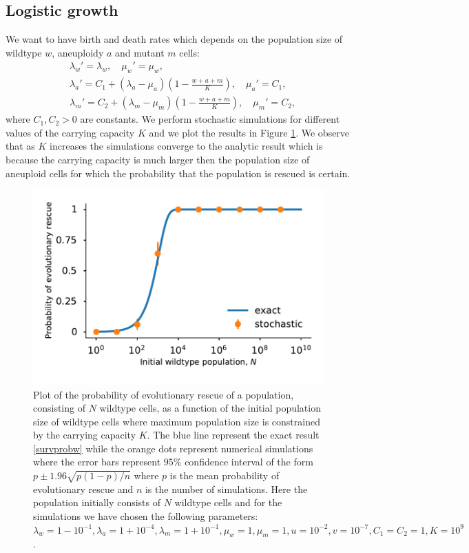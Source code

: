 \documentclass[12pt]{extarticle}
\begin{document}
\subsection*{Logistic growth}
We want to have birth and death rates which depends on the population size of wildtype $w$, aneuploidy $a$ and mutant $m$ cells:
\begin{align*}
&\lambda_w'=\lambda_w,\quad\mu_w'=\mu_w,\\
&\lambda_a'=C_1+\left(\lambda_a-\mu_a\right)\left(1-\frac{w+a+m}{K}\right),\quad \mu_a'=C_1,\\
&\lambda_m'=C_2+\left(\lambda_m-\mu_m\right)\left(1-\frac{w+a+m}{K}\right),\quad \mu_m'=C_2,
\end{align*}
where $C_1, C_2>0$ are constants. We perform stochastic simulations for different values of the carrying capacity $K$ and we plot the results in Figure \ref{SurvPlotNDataLogisticKComplete}.  We observe that as $K$ increases the simulations converge to the analytic result which is because the carrying capacity is much larger then the population size of aneuploid cells for which the probability that the population is rescued is certain.

\begin{figure}[!t]
 \vspace*{1\baselineskip}
\includegraphics[width=1\textwidth]{Figures/SurvPlotNDataLogisticK.pdf}
\caption{Plot of the probability of evolutionary rescue of a population, consisting of $N$ wildtype cells, as a function of the initial population size of wildtype cells where maximum population size is constrained by the carrying capacity $K$.  The blue line represent the exact result \eqref{survprobw} while the orange dots represent numerical simulations where the error bars represent $95\%$ confidence interval of the form $p\pm1.96\sqrt{p\left(1-p\right)/n}$ where $p$ is the mean probability of evolutionary rescue and $n$ is the number of simulations. Here the population initially consists of $N$ wildtype cells and for the simulations we have chosen the following parameters: $\lambda_w=1-10^{-1},\lambda_a=1+10^{-4},\lambda_m=1+10^{-1},\mu_w=1,\mu_m=1,u=10^{-2},v=10^{-7}, C_1=C_2=1, K=10^9$.}
\label{SurvPlotNDataLogisticKComplete}
\end{figure}
\end{document}
